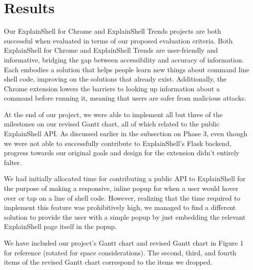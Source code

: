 \documentclass[11pt]{article}
\begin{document}
\section{Results}

Our ExplainShell for Chrome and ExplainShell Trends projects are both successful
when evaluated in terms of our proposed evaluation criteria. Both ExplainShell
for Chrome and ExplainShell Trends are user-friendly and informative, bridging
the gap between accessibility and accuracy of information. Each embodies a
solution that helps people learn new things about command line shell code,
improving on the solutions that already exist. Additionally, the Chrome
extension lowers the barriers to looking up information about a command before
running it, meaning that users are safer from malicious attacks.

At the end of our project, we were able to implement all but three of the
milestones on our revised Gantt chart, all of which related to the public
ExplainShell API. As discussed earlier in the subsection on Phase 3, even though
we were not able to successfully contribute to ExplainShell's Flask backend,
progress towards our original goals and design for the extension didn't entirely
falter.

We had initially allocated time for contributing a public API to
ExplainShell for the purpose of making a responsive, inline popup for when a user
would hover over or tap on a line of shell code. However, realizing that the
time required to implement this feature was prohibitively high, we managed to
find a different solution to provide the user with a simple popup by just
embedding the relevant ExplainShell page itself in the popup.

We have included our project's Gantt chart and revised Gantt chart in
Figure 1 for reference (rotated for space considerations). The
second, third, and fourth items of the revised Gantt chart correspond to the
items we dropped.
\end{document}
